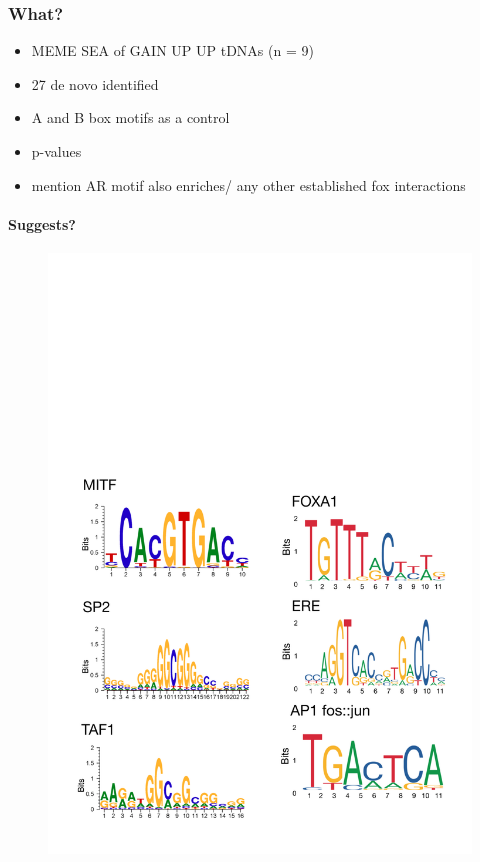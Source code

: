 \documentclass[
  12pt,
]{article}
\begin{document}
\hypertarget{what}{%
\subsubsection{What?}\label{what}}

\begin{itemize}
\item
  MEME SEA of GAIN UP UP tDNAs (n = 9)
\item
  27 de novo identified
\item
  A and B box motifs as a control
\item
  p-values
\item
  mention AR motif also enriches/ any other established fox interactions
\end{itemize}

\hypertarget{suggests}{%
\paragraph{Suggests?}\label{suggests}}

\begin{figure}[p]
\includegraphics[width=1\linewidth]{../images/results-05} \end{figure}
\end{document}
